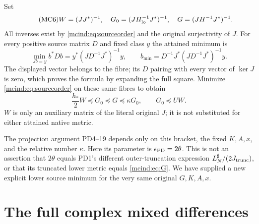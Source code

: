 \documentclass[11pt]{article}
\begin{document}
Set
\begin{equation}\tag{MC6}\label{mcind:eq:G}
 W=(JJ^*)^{-1},\quad
 G_0=(JH_{\rm lo}^{-1}J^*)^{-1},\quad
 G=(JH^{-1}J^*)^{-1}.
\end{equation}
All inverses exist by \eqref{mcind:eq:sourceorder} and the original
surjectivity of $J$. For every positive source matrix $D$ and
fixed class $y$ the attained minimum is
\[
 \min_{Jb=y}b^*Db=y^*(JD^{-1}J^*)^{-1}y,
 \qquad b_{\min}=D^{-1}J^*(JD^{-1}J^*)^{-1}y.
\]
The displayed vector belongs to the fibre; its $D$ pairing with
every vector of $\ker J$ is zero, which proves the formula by
expanding the full square. Minimize \eqref{mcind:eq:sourceorder} on
these same fibres to obtain
\begin{equation}\tag{MC7}\label{mcind:eq:classorder}
 \boxed{\frac{h_*}{2}W\preceq G_0\preceq G\preceq\kappa G_0,
                    \qquad G_0\preceq UW.}
\end{equation}
$W$ is only an auxiliary matrix of the literal original $J$;
it is not substituted for either attained native metric.

The projection argument PD4--19 depends only on this bracket,
the fixed $K,A,x$, and the relative number $\kappa$. Here its
parameter is $\epsilon_{\rm PD}=2\theta$. This is not an
assertion that $2\theta$ equals PD1's different outer-truncation
expression $L_N^\sharp/(2J_{\rm trunc})$, or that its truncated
lower metric equals \eqref{mcind:eq:G}. We have supplied a new explicit
lower source minimum for the very same original $G,K,A,x$.

\section{The full complex mixed differences}
\end{document}

